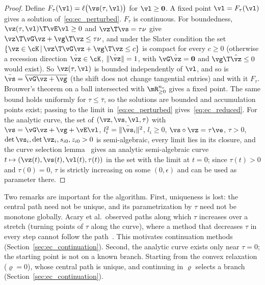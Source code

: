 %
\begin{proof}
	Define $F_{\tau}(\vl) = \ell\big(\vs(\tau, \vl)\big)$ for $\vl \geq \mathbf{0}$. A fixed point $\vl = F_{\tau}(\vl)$ gives a solution of~\eqref{eq:ec_perturbed}. $F_{\tau}$ is continuous. For boundedness, $\vz(\tau, \vl)\T\vE\vl \geq 0$ and $\vz\T\vs = \tau\nu$ give $\vz\T\vG\vz + \vg\T\vz \leq \tau\nu$, and under the Slater condition the set $\{\vz \in \cK \, | \, \vz\T\vG\vz + \vg\T\vz \leq c\}$ is compact for every $c \geq 0$ (otherwise a recession direction $\hat{\vz} \in \cK$, $\|\hat{\vz}\| = 1$, with $\vG\hat{\vz} = \mathbf{0}$ and $\vg\T\hat{\vz} \leq 0$ would exist). So $\vz(\tau, \vl)$ is bounded independently of $\vl$, and so is $\bar{\vs} = \overline{\vG\vz + \vg}$ (the shift does not change tangential entries) and with it $F_{\tau}$. Brouwer's theorem on a ball intersected with $\mR^{n_c}_{\geq 0}$ gives a fixed point. The same bound holds uniformly for $\tau \leq \bar{\tau}$, so the solutions are bounded and accumulation points exist; passing to the limit in~\eqref{eq:ec_perturbed} gives~\eqref{eq:ec_reduced}. For the analytic curve, the set of $(\vz, \vs, \vl, \tau)$ with $\vs = \vG\vz + \vg + \vE\vl$, $l_i^2 = \|\bar{\vs}_i\|^2$, $l_i \geq 0$, $\vs\circ\vz = \tau\ve$, $\tau > 0$, $\det\vs_i, \det\vz_i, s_{i0}, z_{i0} > 0$ is semi-algebraic, every limit lies in its closure, and the curve selection lemma~\cite{Milnor1968} gives an analytic semi-algebraic curve $t \mapsto (\vz(t), \vs(t), \vl(t), \tau(t))$ in the set with the limit at $t = 0$; since $\tau(t) > 0$ and $\tau(0) = 0$, $\tau$ is strictly increasing on some $(0, \epsilon)$ and can be used as parameter there.
\end{proof}
%
Two remarks are important for the algorithm. First, uniqueness is lost: the central path need not be unique, and its parametrization by $\tau$ need not be monotone globally. Acary et al.\ observed paths along which $\tau$ increases over a stretch (turning points of $\tau$ along the curve), where a method that decreases $\tau$ in every step cannot follow the path~\cite{Acary2026}. This motivates continuation methods (Section~\ref{sec:ec_continuation}). Second, the analytic curve exists only near $\tau = 0$; the starting point is not on a known branch. Starting from the convex relaxation ($\varrho = 0$), whose central path is unique, and continuing in $\varrho$ selects a branch (Section~\ref{sec:ec_continuation}).
%
